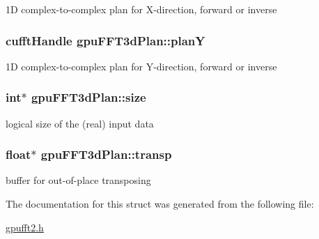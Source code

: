 1D complex-\/to-\/complex plan for X-\/direction, forward or inverse 

\hypertarget{structgpuFFT3dPlan_a21ee894929ab629c48d1272250b752d1}{
\subsubsection[{planY}]{\setlength{\rightskip}{0pt plus 5cm}cufftHandle {\bf gpuFFT3dPlan::planY}}}
\label{structgpuFFT3dPlan_a21ee894929ab629c48d1272250b752d1}


1D complex-\/to-\/complex plan for Y-\/direction, forward or inverse 

\hypertarget{structgpuFFT3dPlan_acfb7f6674c6dec2f2e5d6defbe701f73}{
\subsubsection[{size}]{\setlength{\rightskip}{0pt plus 5cm}int$\ast$ {\bf gpuFFT3dPlan::size}}}
\label{structgpuFFT3dPlan_acfb7f6674c6dec2f2e5d6defbe701f73}


logical size of the (real) input data 

\hypertarget{structgpuFFT3dPlan_af3ef02885f6804f4b30f06b333550d81}{
\subsubsection[{transp}]{\setlength{\rightskip}{0pt plus 5cm}float$\ast$ {\bf gpuFFT3dPlan::transp}}}
\label{structgpuFFT3dPlan_af3ef02885f6804f4b30f06b333550d81}


buffer for out-\/of-\/place transposing 



The documentation for this struct was generated from the following file:\begin{DoxyCompactItemize}
\item 
\hyperlink{gpufft2_8h}{gpufft2.h}\end{DoxyCompactItemize}
